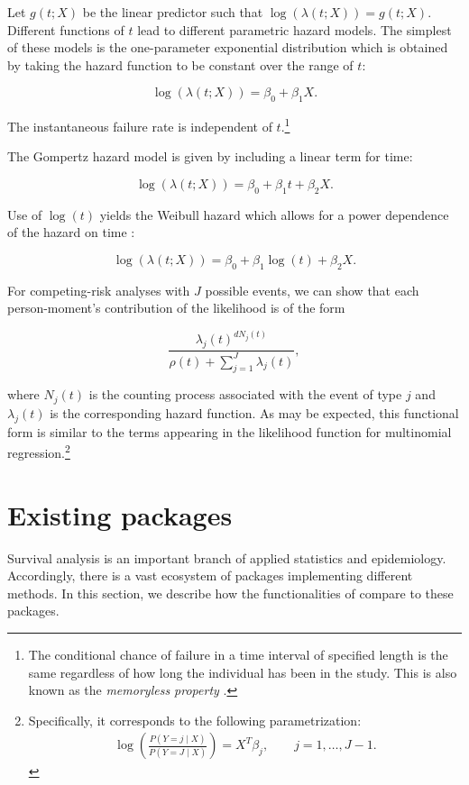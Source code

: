 \documentclass[
]{jss}
\begin{document}
Let \(g(t; X)\) be the linear predictor such that
\(\log(\lambda(t;X)) = g(t; X)\). Different functions of \(t\) lead to
different parametric hazard models. The simplest of these models is the
one-parameter exponential distribution which is obtained by taking the
hazard function to be constant over the range of \(t\):

\[ \log(\lambda(t; X)) = \beta_0 + \beta_1 X.\]

The instantaneous failure rate is independent of
\(t\).\footnote{The conditional chance of failure in a time interval of specified length is the same regardless of how long the individual has been in the study. This is also known as the \textit{memoryless property} \citep{kalbfleisch2011statistical}.}

The Gompertz hazard model is given by including a linear term for time:

\[ \log(\lambda(t; X)) = \beta_0 + \beta_1 t + \beta_2 X.\]

Use of \(\log(t)\) yields the Weibull hazard which allows for a power
dependence of the hazard on time \citep{kalbfleisch2011statistical}:

\[ \log(\lambda(t; X)) = \beta_0 + \beta_1 \log(t) + \beta_2 X. \]

For competing-risk analyses with \(J\) possible events, we can show that
each person-moment's contribution of the likelihood is of the form

\[\frac{\lambda_j(t)^{dN_j(t)}}{\rho(t) + \sum_{j=1}^J\lambda_j(t)},\]

where \(N_j(t)\) is the counting process associated with the event of
type \(j\) and \(\lambda_j(t)\) is the corresponding hazard function. As
may be expected, this functional form is similar to the terms appearing
in the likelihood function for multinomial
regression.\footnote{Specifically, it corresponds to the following parametrization: \begin{align*} \log\left(\frac{P(Y=j \mid X)}{P(Y = J \mid X)}\right) = X^T\beta_j, \qquad j = 1,\ldots, J-1.\end{align*}}

\hypertarget{existing-packages}{%
\section{Existing packages}\label{existing-packages}}

Survival analysis is an important branch of applied statistics and
epidemiology. Accordingly, there is a vast ecosystem of 
packages implementing different methods. In this section, we describe
how the functionalities of  compare to these packages.
\end{document}

